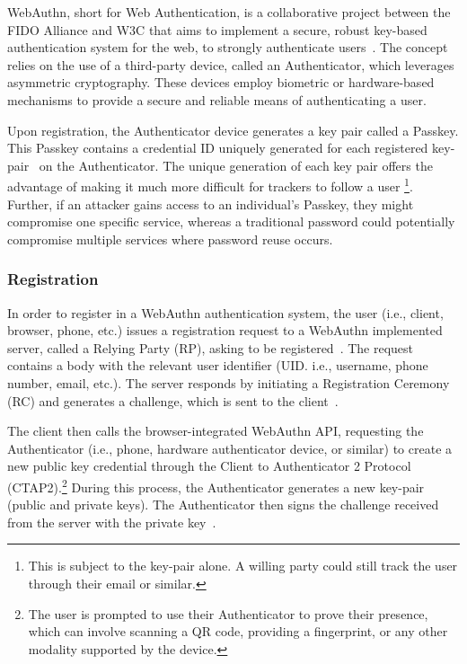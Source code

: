 
\newcommand{\credIdentifier}{\footnote{There is a requirement to check whether the credential identifier, generated by the Authenticator
device exsits on the server.
For further discussions on this topic, see section \hyperref[sec:futurework]{Future work}}}

\newcommand{\navigatorApi}{\footnote{In LessPM's case, this is the \textit{navigator.credentials} API provided by the browser.}}


WebAuthn, short for Web Authentication, is a collaborative project between the FIDO Alliance and W3C that aims to
implement a secure, robust key-based authentication system for the web, to strongly authenticate users~\cite{webauthn_level_2}.
The concept relies on the use of a third-party device, called an Authenticator, which leverages asymmetric cryptography.
These devices employ biometric or hardware-based mechanisms to provide a secure and reliable means of authenticating a
user.

Upon registration, the Authenticator device generates a key pair called a Passkey.
This Passkey contains a credential ID uniquely generated for each registered key-pair~\cite{webauthn_credential_id,webauthn_public_key_credential}
on the Authenticator.
The unique generation of each key pair offers the advantage of making it much more difficult for trackers to follow a user
\footnote{This is subject to the key-pair alone. A willing party could still track the user through their email or similar.}.
Further, if an attacker gains access to an individual's Passkey, they might compromise one specific service, whereas
a traditional password could potentially compromise multiple services where password reuse occurs\cite{wang2018next}.

\subsubsection{Registration}\label{subsubsec:registration}
In order to register in a WebAuthn authentication system, the user (i.e., client, browser, phone, etc.) issues a registration request to a
WebAuthn implemented server, called a Relying Party (RP), asking to be
registered~\cite{webauthn-2-rp}.
The request contains a body with the relevant user identifier (UID. i.e.,
username, phone number, email, etc.).
The server responds by initiating a Registration Ceremony (RC) and generates a
challenge, which is sent to the client~\cite{webauthn-2}.

The client then calls the browser-integrated WebAuthn API, requesting the
Authenticator (i.e., phone, hardware authenticator device, or similar)
to create a new public key credential through the Client to Authenticator 2
Protocol (CTAP2).\footnote{
  The user is prompted to use their Authenticator to prove their presence, which can involve scanning a QR code,
  providing a fingerprint, or any other modality supported by the device.}
During this process, the Authenticator generates a new key-pair (public and
private keys).
The Authenticator then signs the challenge received from the server with the
private key~\cite{webauthn-2-registering}.

